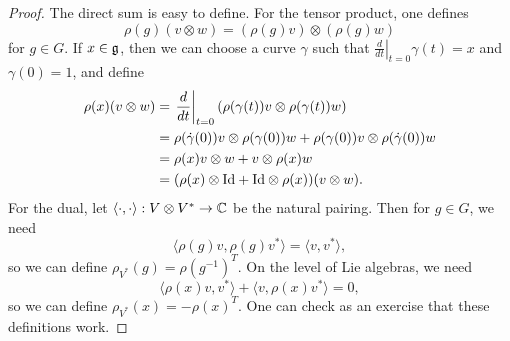 \begin{proof}
  The direct sum is easy to define.
  For the tensor product, one defines
  \[
    \rho(g)(v \otimes w)
    = (\rho(g)v) \otimes (\rho(g)w)
  \]
  for $g \in G$.
  If $x \in \mathfrak{g}$, then we can choose
  a curve $\gamma$ such that
  $\left.\frac{d}{dt}\right|_{t = 0} \gamma(t) = x$
  and $\gamma(0) = 1$,
  and define
  \begin{align*}
    \rho(x)(v \otimes w)
    &= \left.\frac{d}{dt}\right|_{t = 0}
    (\rho(\gamma(t)) v \otimes \rho(\gamma(t)) w) \\
    &= \rho(\dot{\gamma}(0))v \otimes \rho(\gamma(0))w
    + \rho(\gamma(0))v \otimes \rho(\dot{\gamma}(0))w \\
    &= \rho(x)v \otimes w + v \otimes \rho(x)w \\
    &= (\rho(x) \otimes {\operatorname{Id}} + {\operatorname{Id}} \otimes \rho(x))(v \otimes w).
  \end{align*}
  For the dual, let
  $\langle \cdot, \cdot \rangle : V \otimes V^* \to \mathbb{C}$
  be the natural pairing. Then for
  $g \in G$, we need
  \[
    \langle \rho(g) v, \rho(g) v^* \rangle
    = \langle v, v^* \rangle,
  \]
  so we can define
  $\rho_{V^*}(g) = \rho(g^{-1})^T$.
  On the level of Lie algebras, we need
  \[
    \langle \rho(x) v, v^* \rangle
    + \langle v, \rho(x) v^* \rangle = 0,
  \]
  so we can define
  $\rho_{V^*}(x) = -\rho(x)^T$. One can
  check as an exercise that these
  definitions work.
\end{proof}
